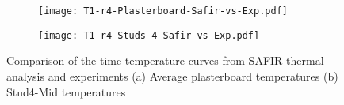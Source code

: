 \begin{figure}[!htbp]
	\centering
	\begin{subfigure}[b]{0.7\textwidth}
		\centering
		\texttt{[image: T1-r4-Plasterboard-Safir-vs-Exp.pdf]}
		\caption{}
		\label{subfig:T1-r4-Plasterboard-Safir-vs-Exp}
	\end{subfigure}
	\begin{subfigure}[b]{0.6\textwidth}
		\centering
		\texttt{[image: T1-r4-Studs-4-Safir-vs-Exp.pdf]}
		\caption{}
		\label{subfig:T1-r4-Studs-4-Safir-vs-Exp}
	\end{subfigure}
	   \caption{Comparison of the time temperature curves from SAFIR thermal analysis and experiments (a) Average plasterboard temperatures (b) Stud4-Mid temperatures}
	   \label{fig:T1-safir-vs-experiment}
\end{figure}

